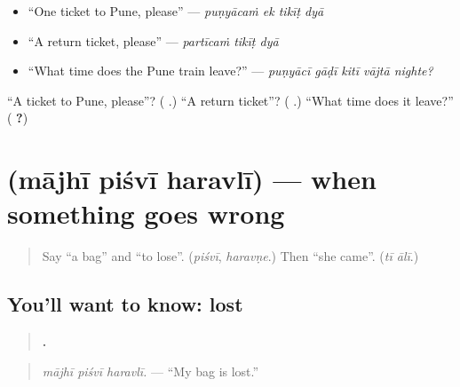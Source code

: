 \begin{itemize}
\raggedright
  \item \textquotedblleft{}One ticket to Pune, please\textquotedblright{} — \emph{puṇyācaṁ ek tikīṭ dyā}
  \item \textquotedblleft{}A return ticket, please\textquotedblright{} — \emph{partīcaṁ tikīṭ dyā}
  \item \textquotedblleft{}What time does the Pune train leave?\textquotedblright{} — \emph{puṇyācī gāḍī kitī vājtā nighte?}
\end{itemize}

\begin{tcolorbox}[breakable,colback=teal!4,colframe=teal!35!black,title={Before you move on}]
\textquotedblleft{}A ticket to Pune, please\textquotedblright{}? (\textbf{   }.) \textquotedblleft{}A return ticket\textquotedblright{}? (\textbf{ }.) \textquotedblleft{}What time does it leave?\textquotedblright{} (\textbf{  ?})
\end{tcolorbox}
\section[\texorpdfstring{\mr{माझी} \mr{पिशवी} \mr{हरवली} (mājhī piśvī haravlī)}{माझी पिशवी हरवली (mājhī piśvī haravlī)}]{   (mājhī piśvī haravlī) — when something goes wrong}

\label{lesson:MR-C283-haravli}



\begin{quote}
Say \textquotedblleft{}a bag\textquotedblright{} and \textquotedblleft{}to lose\textquotedblright{}. (\emph{piśvī}, \emph{haravṇe}.) Then \textquotedblleft{}she came\textquotedblright{}. (\emph{tī ālī}.)
\end{quote}

\subsection*{You'll want to know: lost}
\begin{quote}
\textbf{  .}
\end{quote}

\begin{quote}
\emph{mājhī piśvī haravlī.} — \textquotedblleft{}My bag is lost.\textquotedblright{}
\end{quote}

